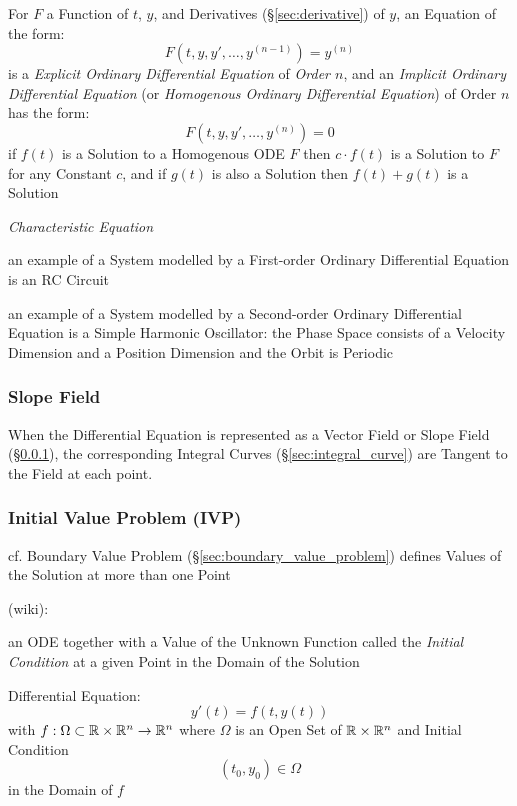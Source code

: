 For $F$ a Function of $t$, $y$, and Derivatives (\S\ref{sec:derivative}) of
$y$, an Equation of the form:
\[
  F(t,y,y',\ldots,y^{(n-1)}) = y^{(n)}
\]
is a \emph{Explicit Ordinary Differential Equation} of \emph{Order $n$}, and an
\emph{Implicit Ordinary Differential Equation} (or \emph{Homogenous Ordinary
  Differential Equation}) of Order $n$ has the form:
\[
  F(t,y,y',\ldots,y^{(n)}) = 0
\]
if $f(t)$ is a Solution to a Homogenous ODE $F$ then $c\cdot{f(t)}$ is a
Solution to $F$ for any Constant $c$, and if $g(t)$ is also a Solution then
$f(t) + g(t)$ is a Solution

\emph{Characteristic Equation}

an example of a System modelled by a First-order Ordinary Differential Equation
is an RC Circuit

an example of a System modelled by a Second-order Ordinary Differential
Equation is a Simple Harmonic Oscillator: the Phase Space consists of a
Velocity Dimension and a Position Dimension and the Orbit is Periodic



\subsubsection{Slope Field}\label{sec:slope_field}

When the Differential Equation is represented as a Vector Field or Slope Field
(\S\ref{sec:slope_field}), the corresponding Integral Curves
(\S\ref{sec:integral_curve}) are Tangent to the Field at each point.



\subsubsection{Initial Value Problem (IVP)}\label{sec:ivp}

\fist cf. Boundary Value Problem (\S\ref{sec:boundary_value_problem}) defines
Values of the Solution at more than one Point

(wiki):

an ODE together with a Value of the Unknown Function called the \emph{Initial
  Condition} at a given Point in the Domain of the Solution

Differential Equation:
\[
  y'(t) = f(t, y(t))
\]
with $f : \Omega \subset \mathbb{R} \times \mathbb{R}^n \rightarrow \mathbb{R}^n$ where
$\Omega$ is an Open Set of $\mathbb{R} \times \mathbb{R}^n$ and Initial Condition
\[
  (t_0, y_0) \in \Omega
\]
in the Domain of $f$

